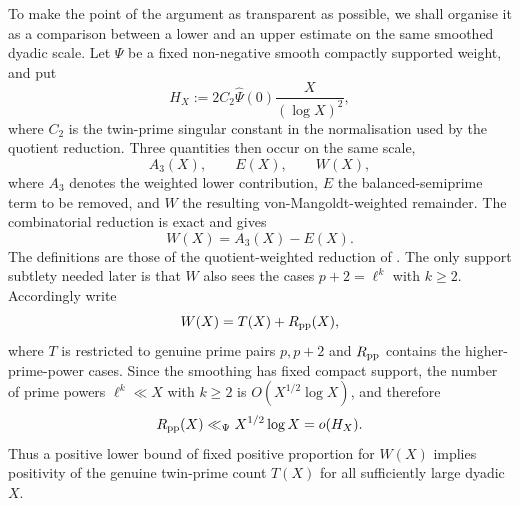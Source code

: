 \documentclass{aomart}
\theoremstyle{definition}
\newcommand{\1}{\mathbf 1}
\begin{document}
To make the point of the argument as transparent as possible, we shall organise it as a comparison between a lower and an upper estimate on the same smoothed dyadic scale.  Let $\Psi$ be a fixed non-negative smooth compactly supported weight, and put
\begin{equation}\label{eq:HX}
 H_X:=2C_2\widehat\Psi(0)\frac{X}{(\log X)^2},
\end{equation}
where $C_2$ is the twin-prime singular constant in the normalisation used by the quotient reduction.  Three quantities then occur on the same scale,
\[
 A_3(X),\qquad E(X),\qquad W(X),
\]
where $A_3$ denotes the weighted lower contribution, $E$ the balanced-semiprime term to be removed, and $W$ the resulting von-Mangoldt-weighted remainder.  The combinatorial reduction is exact and gives
\begin{equation}\label{eq:Widentity}
 W(X)=A_3(X)-E(X).
\end{equation}
The definitions are those of the quotient-weighted reduction of \cite{RatliffReduction2026,RatliffRough2026}.  The only support subtlety needed later is that $W$ also sees the cases $p+2=\ell^k$ with $k\ge2$.  Accordingly write
\begin{equation}\label{eq:primepowersplit}
 W(X)=T(X)+R_{\rm pp}(X),
\end{equation}
where $T$ is restricted to genuine prime pairs $p,p+2$ and $R_{\rm pp}$ contains the higher-prime-power cases.  Since the smoothing has fixed compact support, the number of prime powers $\ell^k\ll X$ with $k\ge2$ is $O(X^{1/2}\log X)$, and therefore
\begin{equation}\label{eq:primepowererror}
 R_{\rm pp}(X)\ll_\Psi X^{1/2}\log X=o(H_X).
\end{equation}
Thus a positive lower bound of fixed positive proportion for $W(X)$ implies positivity of the genuine twin-prime count $T(X)$ for all sufficiently large dyadic $X$.
\end{document}
